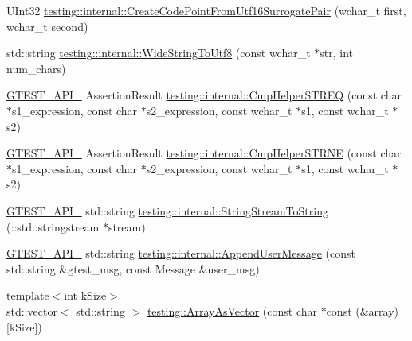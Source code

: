 \begin{DoxyCompactItemize}
\item 
U\+Int32 \mbox{\hyperlink{namespacetesting_1_1internal_ac8ef1bb10cd9e69de939789b759e6bc9}{testing\+::internal\+::\+Create\+Code\+Point\+From\+Utf16\+Surrogate\+Pair}} (wchar\+\_\+t first, wchar\+\_\+t second)
\item 
std\+::string \mbox{\hyperlink{namespacetesting_1_1internal_a05b8c86ff38243f34d8f839a0eadefb1}{testing\+::internal\+::\+Wide\+String\+To\+Utf8}} (const wchar\+\_\+t $\ast$str, int num\+\_\+chars)
\item 
\mbox{\hyperlink{_obj__test_2lib_2googletest-release-1_88_81_2googletest_2include_2gtest_2internal_2gtest-port_8h_aa73be6f0ba4a7456180a94904ce17790}{G\+T\+E\+S\+T\+\_\+\+A\+P\+I\+\_\+}} Assertion\+Result \mbox{\hyperlink{namespacetesting_1_1internal_ad351878f87634853c4eb005fe9b169a8}{testing\+::internal\+::\+Cmp\+Helper\+S\+T\+R\+EQ}} (const char $\ast$s1\+\_\+expression, const char $\ast$s2\+\_\+expression, const wchar\+\_\+t $\ast$s1, const wchar\+\_\+t $\ast$s2)
\item 
\mbox{\hyperlink{_obj__test_2lib_2googletest-release-1_88_81_2googletest_2include_2gtest_2internal_2gtest-port_8h_aa73be6f0ba4a7456180a94904ce17790}{G\+T\+E\+S\+T\+\_\+\+A\+P\+I\+\_\+}} Assertion\+Result \mbox{\hyperlink{namespacetesting_1_1internal_a415a953647bbc9469f062dc966061efb}{testing\+::internal\+::\+Cmp\+Helper\+S\+T\+R\+NE}} (const char $\ast$s1\+\_\+expression, const char $\ast$s2\+\_\+expression, const wchar\+\_\+t $\ast$s1, const wchar\+\_\+t $\ast$s2)
\item 
\mbox{\hyperlink{_obj__test_2lib_2googletest-release-1_88_81_2googletest_2include_2gtest_2internal_2gtest-port_8h_aa73be6f0ba4a7456180a94904ce17790}{G\+T\+E\+S\+T\+\_\+\+A\+P\+I\+\_\+}} std\+::string \mbox{\hyperlink{namespacetesting_1_1internal_ac0a2b7f69fc829d80a39e925b6417e39}{testing\+::internal\+::\+String\+Stream\+To\+String}} (\+::std\+::stringstream $\ast$stream)
\item 
\mbox{\hyperlink{_obj__test_2lib_2googletest-release-1_88_81_2googletest_2include_2gtest_2internal_2gtest-port_8h_aa73be6f0ba4a7456180a94904ce17790}{G\+T\+E\+S\+T\+\_\+\+A\+P\+I\+\_\+}} std\+::string \mbox{\hyperlink{namespacetesting_1_1internal_ae475a090bca903bb222dd389eb189166}{testing\+::internal\+::\+Append\+User\+Message}} (const std\+::string \&gtest\+\_\+msg, const Message \&user\+\_\+msg)
\item 
{\footnotesize template$<$int k\+Size$>$ }\\std\+::vector$<$ std\+::string $>$ \mbox{\hyperlink{namespacetesting_ab25cc403881367e4ae289dab4eb37f5d}{testing\+::\+Array\+As\+Vector}} (const char $\ast$const (\&array)\mbox{[}k\+Size\mbox{]})

\end{DoxyCompactItemize}
